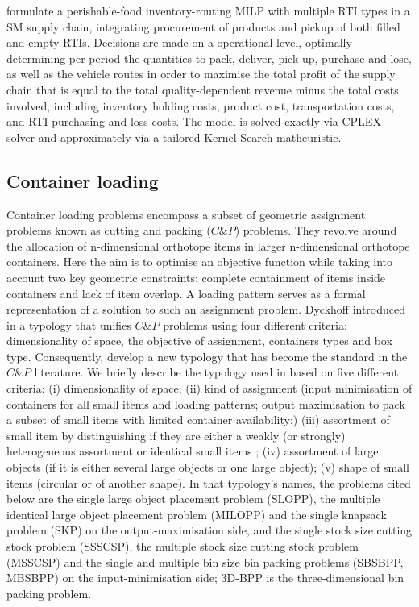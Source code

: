 \autocite{Zhang17012024} formulate a perishable-food inventory-routing MILP with multiple RTI types in a SM supply chain, integrating procurement of products and pickup of both filled and empty RTIs. Decisions are made on a operational level, optimally determining per period the quantities to pack, deliver, pick up, purchase and lose, as well as the vehicle routes in order to maximise the total profit of the supply chain that is equal to the total quality-dependent revenue minus the total costs involved, including inventory holding costs, product cost, transportation costs, and RTI purchasing and loss costs. The model is solved exactly via CPLEX  solver and approximately via a tailored Kernel Search matheuristic.


\subsection{Container loading}

Container loading problems encompass a subset of geometric assignment problems known as cutting and packing ($C\&P$) problems. They revolve around the allocation of n-dimensional orthotope items in larger n-dimensional orthotope containers. Here the aim is to optimise an objective function while taking into account two key geometric constraints: complete containment of items inside containers and lack of item overlap. A loading pattern serves as a formal representation of a solution to such an assignment problem.
Dyckhoff introduced in \autocite{Dyckhoff1990AProblems} a typology that unifies $C\&P$ problems using four different criteria: dimensionality of space, the objective of assignment, containers types and box type. Consequently, \autocite{Wascher2007AnProblems} develop a new typology that has become the standard in the $C\&P$ literature. We   briefly  describe  the  typology  used  in  \autocite{Wascher2007AnProblems}  based  on  five different criteria: (i) dimensionality of space; (ii) kind of assignment (input minimisation of containers for all small items and loading patterns; output maximisation to pack a subset of small items with limited container availability;) (iii) assortment of small item by distinguishing if they are either a weakly (or strongly) heterogeneous assortment or identical small items ; (iv) assortment of large objects (if it is either several large objects or one large object); (v) shape of small items (circular or of another shape). In that typology's names, the problems cited below are the single large object placement problem (SLOPP), the multiple identical large object placement problem (MILOPP) and the single knapsack problem (SKP) on the output-maximisation side, and the single stock size cutting stock problem (SSSCSP), the multiple stock size cutting stock problem (MSSCSP) and the single and multiple bin size bin packing problems (SBSBPP, MBSBPP) on the input-minimisation side; 3D-BPP is the three-dimensional bin packing problem.





